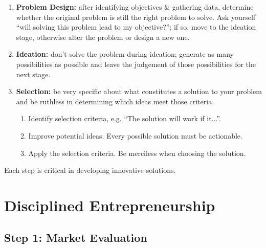 \documentclass[a4paper,11pt]{article}
\begin{document}
\begin{enumerate}
    \item   \textbf{Problem Design:} after identifying objectives \& gathering data, determine whether the 
            original problem is still the right problem to solve.
            Ask yourself ``will solving this problem lead to my objective?''; if so, move to the ideation stage,
            otherwise alter the problem or design a new one.

    \item   \textbf{Ideation:} don't solve the problem during ideation; generate as many possibilities as possible
            and leave the judgement of those possibilities for the next stage.

    \item   \textbf{Selection:} be very specific about what constitutes a solution to your problem and be 
            ruthless in determining which ideas meet those criteria.
            \begin{enumerate}[label=\roman*.]
                \item   Identify selection criteria, e.g. ``The solution will work if it...''.
                \item   Improve potential ideas. Every possible solution must be actionable.
                \item   Apply the selection criteria. Be merciless when choosing the solution.
            \end{enumerate}
\end{enumerate}

Each step is critical in developing innovative solutions.

\section{Disciplined Entrepreneurship}

\subsection{Step 1: Market Evaluation}
\end{document}
